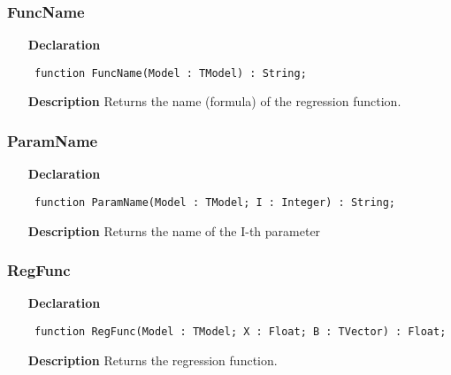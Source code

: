 \documentclass[12pt,a4paper,oneside]{report}
\newcommand{\declarationitem}[1]{\textbf{#1}}
\newcommand{\descriptiontitle}[1]{\textbf{#1}}
\newcommand{\code}[1]{\texttt{#1}}
\begin{document}
\subsubsection{FuncName}
\label{umodels-FuncName}
\begin{itemize}\item[\declarationitem{Declaration}\hfill]
	\begin{flushleft}
		\code{
			function FuncName(Model : TModel) : String;}
		
	\end{flushleft}
	
	\par
	\item[\descriptiontitle{Description}]
	Returns the name (formula) of the regression function. 	
\end{itemize}
\subsubsection{ParamName}
\label{umodels-ParamName}
\begin{itemize}\item[\declarationitem{Declaration}\hfill]
	\begin{flushleft}
		\code{
			function ParamName(Model : TModel; I : Integer) : String;}
		
	\end{flushleft}
	
	\par
	\item[\descriptiontitle{Description}]
	Returns the name of the I{-}th parameter 	
\end{itemize}
\subsubsection{RegFunc}
\label{umodels-RegFunc}
\begin{itemize}\item[\declarationitem{Declaration}\hfill]
	\begin{flushleft}
		\code{
			function RegFunc(Model : TModel; X : Float; B : TVector) : Float;}
		
	\end{flushleft}
	
	\par
	\item[\descriptiontitle{Description}]
	Returns the regression function. 	
\end{itemize}
\end{document}
